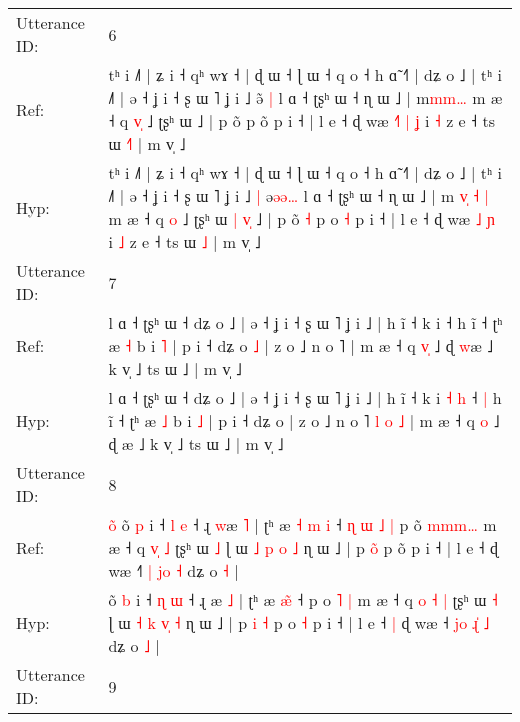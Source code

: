 \documentclass[10pt]{article}
\DeclareRobustCommand{\hl}[1]{{\textcolor{red}{#1}}}
\begin{document}
\begin{longtable}{ll}
\midrule
Utterance ID: & 6 \\
Ref: & tʰ i ˩˥ | ʑ i ˧ qʰ wɤ ˧ | ɖ ɯ ˧ ɭ ɯ ˧ q o ˧ h ɑ̃ ˧˥ | dʑ o ˩ | tʰ i ˩˥ | ə ˧ ʝ i ˧ ʂ ɯ ˥ ʝ i ˩\hl{}\hl{} ə\hl{̃}\hl{ }\hl{|} l ɑ ˧ ʈʂʰ ɯ ˧ ɳ ɯ ˩ | m\hl{}\hl{}\hl{}\hl{}\hl{m}\hl{m}\hl{…} m æ ˧ q \hl{v}\hl{̩} ˩ ʈʂʰ ɯ\hl{}\hl{}\hl{}\hl{}\hl{} ˩ | p õ\hl{}\hl{} p o\hl{}\hl{̃} p i ˧ | l e ˧ ɖ wæ\hl{ }\hl{˧}\hl{˥} \hl{|} \hl{ʝ} i \hl{˧} z e ˧ ts ɯ \hl{˧}\hl{˥} | m v̩ ˩
 \\
Hyp: & tʰ i ˩˥ | ʑ i ˧ qʰ wɤ ˧ | ɖ ɯ ˧ ɭ ɯ ˧ q o ˧ h ɑ̃ ˧˥ | dʑ o ˩ | tʰ i ˩˥ | ə ˧ ʝ i ˧ ʂ ɯ ˥ ʝ i ˩\hl{ }\hl{|} ə\hl{ə}\hl{ə}\hl{…} l ɑ ˧ ʈʂʰ ɯ ˧ ɳ ɯ ˩ | m\hl{ }\hl{v}\hl{̩}\hl{ }\hl{˧}\hl{ }\hl{|} m æ ˧ q \hl{}\hl{o} ˩ ʈʂʰ ɯ\hl{ }\hl{|}\hl{ }\hl{v}\hl{̩} ˩ | p õ\hl{ }\hl{˧} p o\hl{ }\hl{˧} p i ˧ | l e ˧ ɖ wæ\hl{}\hl{}\hl{} \hl{˩} \hl{ɲ} i \hl{˩} z e ˧ ts ɯ \hl{}\hl{˩} | m v̩ ˩
 \\
\midrule
Utterance ID: & 7 \\
Ref: & l ɑ ˧ ʈʂʰ ɯ ˧ dʑ o ˩ | ə ˧ ʝ i ˧ ʂ ɯ ˥ ʝ i ˩ | h ĩ ˧ k i\hl{}\hl{}\hl{}\hl{} ˧\hl{}\hl{} h ĩ ˧ ʈʰ æ \hl{˧} b i \hl{˥} | p i ˧ dʑ o\hl{ }\hl{˩} | z o ˩ n o ˥\hl{}\hl{}\hl{}\hl{}\hl{}\hl{} | m æ ˧ q \hl{v}\hl{̩} ˩ ɖ \hl{w}æ ˩ k v̩ ˩ ts ɯ ˩ | m v̩ ˩
 \\
Hyp: & l ɑ ˧ ʈʂʰ ɯ ˧ dʑ o ˩ | ə ˧ ʝ i ˧ ʂ ɯ ˥ ʝ i ˩ | h ĩ ˧ k i\hl{ }\hl{˧}\hl{ }\hl{h} ˧\hl{ }\hl{|} h ĩ ˧ ʈʰ æ \hl{˩} b i \hl{˩} | p i ˧ dʑ o\hl{}\hl{} | z o ˩ n o ˥\hl{ }\hl{l}\hl{ }\hl{o}\hl{ }\hl{˩} | m æ ˧ q \hl{}\hl{o} ˩ ɖ \hl{}æ ˩ k v̩ ˩ ts ɯ ˩ | m v̩ ˩
 \\
\midrule
Utterance ID: & 8 \\
Ref: & \hl{o}\hl{̃}\hl{ }õ \hl{p} i ˧ \hl{l} \hl{e} ˧ ɻ \hl{w}æ \hl{˥} | ʈʰ æ\hl{ }\hl{˧} \hl{m}\hl{ }\hl{i} ˧\hl{ }\hl{ɳ}\hl{ }\hl{ɯ}\hl{ }\hl{˩}\hl{ }\hl{|} p o\hl{̃} \hl{m}\hl{m}\hl{m}\hl{…} m æ ˧ q \hl{}\hl{v}\hl{̩} \hl{˩} ʈʂʰ ɯ \hl{˩} ɭ ɯ \hl{˩} \hl{p} \hl{}\hl{o} \hl{˩} ɳ ɯ ˩ | p \hl{}\hl{o}\hl{̃} p o\hl{}\hl{̃} p i ˧ | l e ˧\hl{}\hl{} ɖ wæ ˧\hl{˥}\hl{ }\hl{|} \hl{j}\hl{o} \hl{˧} dʑ o \hl{˧} |
 \\
Hyp: & \hl{}\hl{}\hl{}õ \hl{b} i ˧ \hl{ɳ} \hl{ɯ} ˧ ɻ \hl{}æ \hl{˩} | ʈʰ æ\hl{}\hl{} \hl{}\hl{æ}\hl{̃} ˧\hl{}\hl{}\hl{}\hl{}\hl{}\hl{}\hl{}\hl{} p o\hl{} \hl{}\hl{˥}\hl{ }\hl{|} m æ ˧ q \hl{o}\hl{ }\hl{˧} \hl{|} ʈʂʰ ɯ \hl{˧} ɭ ɯ \hl{˧} \hl{k} \hl{v}\hl{̩} \hl{˧} ɳ ɯ ˩ | p \hl{i}\hl{ }\hl{˧} p o\hl{ }\hl{˧} p i ˧ | l e ˧\hl{ }\hl{|} ɖ wæ ˧\hl{ }\hl{j}\hl{o} \hl{ɻ}\hl{̍} \hl{˩} dʑ o \hl{˩} |
 \\
\midrule
Utterance ID: & 9 \\

\end{longtable}
\end{document}
